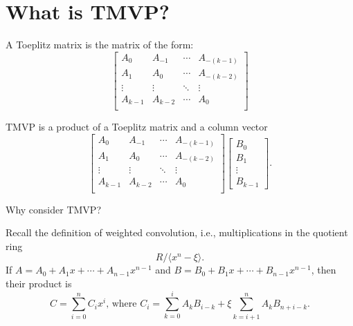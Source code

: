 \documentclass[
11pt,notheorems,hyperref={pdfauthor=whatever}
]{beamer}
\begin{document}
\section{What is TMVP?}
\begin{frame}
    \begin{definition}
        A Toeplitz matrix is the matrix of the form:
        \[
        \begin{bmatrix}
            A_{0} & A_{-1} & \cdots & A_{-(k-1)}\\
            A_{1} & A_{0} & \cdots & A_{-(k-2)}\\
            \vdots & \vdots &\ddots &\vdots \\
            A_{k-1} & A_{k-2} & \cdots & A_{0}\\
        \end{bmatrix}
        \]
    \end{definition}

    \begin{definition}
        TMVP is a product of a Toeplitz matrix and a column vector
        \[
        \begin{bmatrix}
            A_{0} & A_{-1} & \cdots & A_{-(k-1)}\\
            A_{1} & A_{0} & \cdots & A_{-(k-2)}\\
            \vdots & \vdots &\ddots &\vdots \\
            A_{k-1} & A_{k-2} & \cdots & A_{0}\\
        \end{bmatrix}
        \begin{bmatrix}
            B_{0} \\ B_{1} \\ \vdots \\ B_{k-1}
        \end{bmatrix}.
        \]
    \end{definition}
\end{frame}

\begin{frame}
    Why consider TMVP?

    Recall the definition of weighted convolution, i.e., multiplications in the quotient ring
    \[
        R/\langle x^n - \xi \rangle.
    \]
    If $A = A_{0} + A_{1}x+\cdots+A_{n-1}x^{n-1}$ and $B = B_{0} + B_{1} x + \cdots + B_{n-1} x^{n-1}$, then their product is 
    \[
        C = \sum_{i=0}^{n} C_{i} x^{i}\text{, where }C_{i} = \sum_{k=0}^{i} A_{k}B_{i-k} + \xi\sum_{k=i+1}^{n} A_{k}B_{n+i-k}.
    \]
\end{frame}
\end{document}
